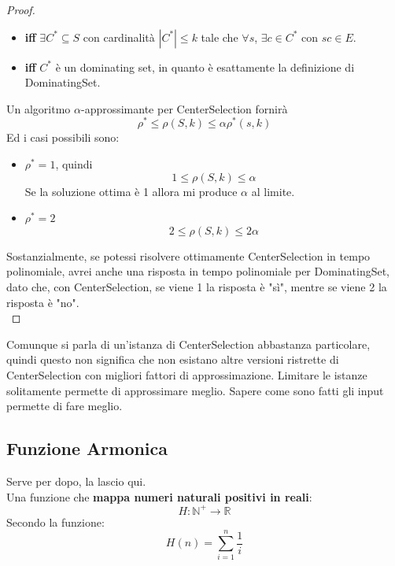 \begin{proof}
\begin{itemize}[label*=]
		\item \textbf{iff} $\exists C^\ast \subseteq S$ con cardinalità $|C^\ast| \leq k$ tale che $\forall s$,  $\exists c \in C^\ast$ con $sc \in E$.\\
		
		\item \textbf{iff} $C^\ast$ è un dominating set, in quanto è esattamente la definizione di DominatingSet.\\
	\end{itemize}
	
	Un algoritmo $\alpha$-approssimante per CenterSelection fornirà
	$$ \rho^\ast \leq \rho (S,k) \leq \alpha \rho^\ast (s,k) $$
	Ed i casi possibili sono:
	\begin{itemize}
		\item $\rho^\ast = 1$, quindi
		$$ 1 \leq \rho(S,k) \leq \alpha $$
		Se la soluzione ottima è 1 allora mi produce $\alpha$ al limite.\\
		
		\item $\rho^\ast = 2$
		$$ 2 \leq \rho(S,k) \leq 2 \alpha $$
	\end{itemize}
	Sostanzialmente, se potessi risolvere ottimamente CenterSelection in tempo polinomiale, avrei anche una risposta in tempo polinomiale per DominatingSet, dato che, con CenterSelection, se viene 1 la risposta è "sì", mentre se viene 2 la risposta è "no".\\
\end{proof}

Comunque si parla di un'istanza di CenterSelection abbastanza particolare, quindi questo non significa che non esistano altre versioni ristrette di CenterSelection con migliori fattori di approssimazione. Limitare le istanze solitamente permette di approssimare meglio. Sapere come sono fatti gli input permette di fare meglio.\\

\newpage

\subsection*{Funzione Armonica}
Serve per dopo, la lascio qui.\\

Una funzione che \textbf{mappa numeri naturali positivi in reali}:
$$ H: \mathbb{N}^+ \rightarrow \mathbb{R} $$
Secondo la funzione:
$$ H(n) = \sum_{i=1}^n \frac{1}{i} $$

